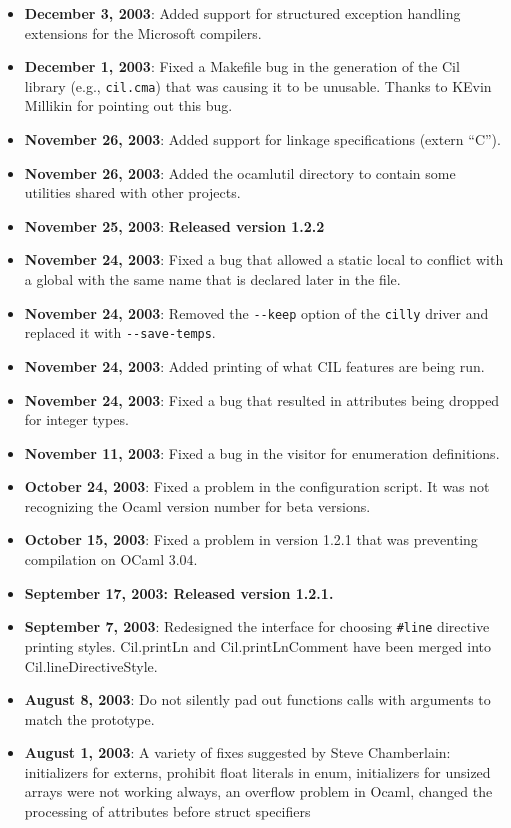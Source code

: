 \documentclass{article}
\def\t#1{{\tt #1}}
\begin{document}
\begin{itemize}
\item {\bf December 3, 2003}: Added support for structured exception handling
  extensions for the Microsoft compilers.
\item {\bf December 1, 2003}: Fixed a Makefile bug in the generation of the 
Cil library (e.g., \t{cil.cma}) that was causing it to be unusable. Thanks
to KEvin Millikin for pointing out this bug. 
\item {\bf November 26, 2003}: Added support for linkage specifications
       (extern ``C''). 
\item {\bf November 26, 2003}: Added the ocamlutil directory to contain some
utilities shared with other projects. 
\item {\bf November 25, 2003}: {\bf Released version 1.2.2}
\item {\bf November 24, 2003}: Fixed a bug that allowed a static local to
  conflict with a global with the same name that is declared later in the
  file. 
\item {\bf November 24, 2003}: Removed the \t{-{}-keep} option of the \t{cilly}
  driver and replaced it with \t{-{}-save-temps}.
\item {\bf November 24, 2003}: Added printing of what CIL features are being
  run.
\item {\bf November 24, 2003}: Fixed a bug that resulted in attributes being
  dropped for integer types. 
\item {\bf November 11, 2003}: Fixed a bug in the visitor for enumeration
  definitions. 
\item {\bf October 24, 2003}: Fixed a problem in the configuration script. It
  was not recognizing the Ocaml version number for beta versions. 
\item {\bf October 15, 2003}: Fixed a problem in version 1.2.1 that was
  preventing compilation on OCaml 3.04.
\item {\bf September 17, 2003: Released version 1.2.1.}
\item {\bf September 7, 2003}: Redesigned the interface for choosing
  \texttt{\#line} directive printing styles.  Cil.printLn and
  Cil.printLnComment have been merged into Cil.lineDirectiveStyle.
\item {\bf August 8, 2003}: Do not silently pad out functions calls with
arguments to match the prototype. 
\item {\bf August 1, 2003}: A variety of fixes suggested by Steve Chamberlain:
initializers for externs, prohibit float literals in enum, initializers for
unsized arrays were not working always, an overflow problem in Ocaml, changed
the processing of attributes before struct specifiers


\end{itemize}
\end{document}

